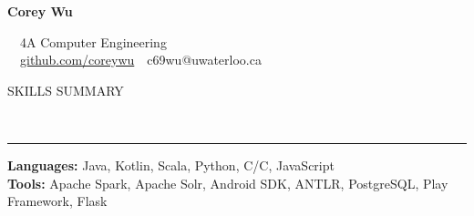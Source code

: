 \documentclass[11pt, letterpaper, oneside]{article}
\makeatletter
\newcommand{\name}{Corey Wu}
\newcommand{\program}{4A Computer Engineering}
\newcommand{\github}{\href{https://github.com/coreywu}{github.com/coreywu}}
\newcommand{\email}{c69wu@uwaterloo.ca}
\newcommand{\HRule}[2]{\textcolor{#1}{\rule{\linewidth}{#2}}}
\newcommand{\sectiontitle}[1]{\begin{minipage}{\textwidth}\vspace{-7.5pt}\begin{flushleft}\hspace{-20.5pt}\vspace{-25pt}
\Large\MakeUppercase{#1}\end{flushleft}\end{minipage}\\\HRule{black}{0.15mm}\vspace{\baselineskip}}
\newenvironment{ressection}[1]{
  \sectiontitle{#1}}
  {\vspace{-\baselineskip}}
\newcommand{\CPP}
{C\nolinebreak[4]\hspace{-.05em}\raisebox{.22ex}{\footnotesize\bf ++}}
\makeatother
\begin{document}
\begin{center}

	{\Huge \textbf{\name}}

	\ \ {\Large{\program}} \\
	\ \ \github \ \textbullet \ \email \ \
\end{center}

\vspace{-16pt}

\begin{ressection}{Skills Summary}\vspace{-12pt}
  \hspace{-20pt} \textbf{Languages:} Java, Kotlin, Scala, Python, C/\CPP, JavaScript \\
  \hspace{-20pt} \textbf{Tools:} Apache Spark, Apache Solr, Android SDK, ANTLR,  PostgreSQL, Play Framework, Flask
\end{ressection}

\vspace{16pt}
\end{document}
